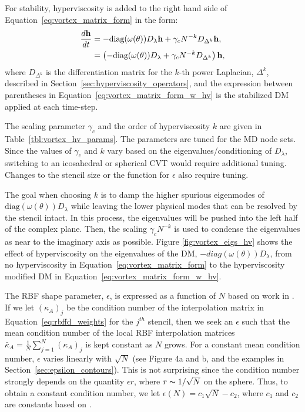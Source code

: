 \documentclass{report}
\begin{document}
For stability, hyperviscosity is added to the right hand side of Equation~\ref{eq:vortex_matrix_form} in the form: 
\begin{align}
\frac{d \mathbf{h}}{d t} & = - \text{diag}(\omega(\theta)) D_\lambda \mathbf{h} + \gamma_c N^{-k} D_{\Delta^{k}} \mathbf{h}, \nonumber \\
 & = \left(- \text{diag}(\omega(\theta)) D_\lambda + \gamma_c N^{-k} D_{\Delta^{k}}\right) \mathbf{h}, 
\label{eq:vortex_matrix_form_w_hv}
\end{align}
where $D_{\Delta^{k}}$ is the differentiation matrix for the $k$-th power Laplacian, $\Delta^{k}$, described in Section~\ref{sec:hyperviscosity_operators}, and the expression between parentheses in Equation~\ref{eq:vortex_matrix_form_w_hv} is the stabilized DM applied at each time-step. 

The scaling parameter $\gamma_c$ and the order of hyperviscosity $k$ are given in
Table~\ref{tbl:vortex_hv_params}. The parameters are tuned for the MD node sets. Since the values of $\gamma_c$ and $k$ vary based on the eigenvalues/conditioning of $D_\lambda$, switching to an icosahedral or spherical CVT would require additional tuning. Changes to the stencil size or the function for $\epsilon$ also require tuning. 

The goal when choosing $k$ is to damp the higher spurious eigenmodes of $\text{diag}(\omega(\theta)) D_\lambda$ while leaving the lower physical modes that can be resolved by the stencil intact. In this process, the eigenvalues will be pushed into the left half of the complex plane. Then, the scaling $\gamma_c N^{-k}$ is used to condense the eigenvalues as near to the imaginary axis as possible. Figure \ref{fig:vortex_eigs_hv} shows the effect of hyperviscosity on the eigenvalues of the DM, $-diag(\omega(\theta)) D_\lambda$, from no hyperviscosity in Equation~\ref{eq:vortex_matrix_form} to the hyperviscosity modified DM in Equation~\ref{eq:vortex_matrix_form_w_hv}. 

The RBF shape parameter, $\epsilon$, is expressed as a function of $N$ based on work in \cite{FlyerLehto11}. If we let $(\kappa_A)_j$ be the condition number of the interpolation matrix in Equation~\ref{eq:rbffd_weights} for the $j^{th}$ stencil, then we seek an $\epsilon$ such that the mean condition number of the local RBF interpolation matrices $\bar{\kappa}_A = \frac{1}{N}\sum_{j=1}^N (\kappa_A)_j$ is kept constant as $N$ grows. For a constant mean condition number, $\epsilon$ varies linearly with $\sqrt{N}$ (see \cite{FlyerLehto11} Figure 4a and b, and the examples in Section~\ref{sec:epsilon_contours}). This is not surprising since the condition number strongly depends on the quantity $\epsilon r$, where $r\thicksim1/\sqrt{N}$ on the sphere. Thus, to obtain a constant condition number, we let $\epsilon (N) = c_1 \sqrt{N} - c_2$, where $c_1$ and $c_2$ are constants based on \cite{FlyerLehto11}.
\end{document}

